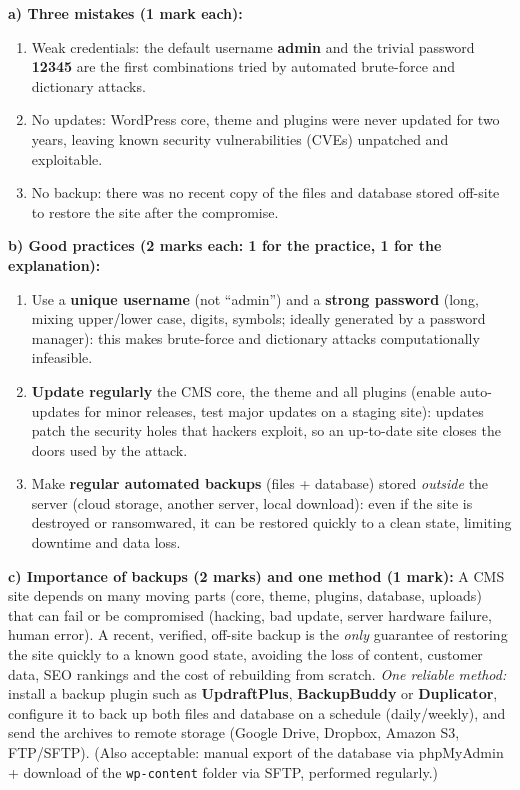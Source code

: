 \documentclass[11pt]{article}
\begin{document}
\begin{corrige}
\textbf{a) Three mistakes (1 mark each):}
\begin{enumerate}
\item Weak credentials: the default username \textbf{admin} and the trivial password \textbf{12345} are the first combinations tried by automated brute-force and dictionary attacks.
\item No updates: WordPress core, theme and plugins were never updated for two years, leaving known security vulnerabilities (CVEs) unpatched and exploitable.
\item No backup: there was no recent copy of the files and database stored off-site to restore the site after the compromise.
\end{enumerate}

\textbf{b) Good practices (2 marks each: 1 for the practice, 1 for the explanation):}
\begin{enumerate}
\item Use a \textbf{unique username} (not ``admin'') and a \textbf{strong password} (long, mixing upper/lower case, digits, symbols; ideally generated by a password manager): this makes brute-force and dictionary attacks computationally infeasible.
\item \textbf{Update regularly} the CMS core, the theme and all plugins (enable auto-updates for minor releases, test major updates on a staging site): updates patch the security holes that hackers exploit, so an up-to-date site closes the doors used by the attack.
\item Make \textbf{regular automated backups} (files + database) stored \emph{outside} the server (cloud storage, another server, local download): even if the site is destroyed or ransomwared, it can be restored quickly to a clean state, limiting downtime and data loss.
\end{enumerate}

\textbf{c) Importance of backups (2 marks) and one method (1 mark):} A CMS site depends on many moving parts (core, theme, plugins, database, uploads) that can fail or be compromised (hacking, bad update, server hardware failure, human error). A recent, verified, off-site backup is the \emph{only} guarantee of restoring the site quickly to a known good state, avoiding the loss of content, customer data, SEO rankings and the cost of rebuilding from scratch. \emph{One reliable method:} install a backup plugin such as \textbf{UpdraftPlus}, \textbf{BackupBuddy} or \textbf{Duplicator}, configure it to back up both files and database on a schedule (daily/weekly), and send the archives to remote storage (Google Drive, Dropbox, Amazon S3, FTP/SFTP). (Also acceptable: manual export of the database via phpMyAdmin + download of the \texttt{wp-content} folder via SFTP, performed regularly.)
\end{corrige}
\end{document}
